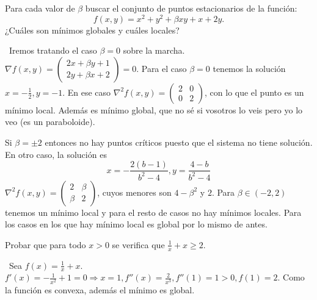 \documentclass[twoside]{article}
\begin{document}
\newpage 

\begin{ejercicio}{5}

Para cada valor de $\beta$ buscar el conjunto de puntos estacionarios de la función: $$f(x,y)=x^2+y^2+\beta xy+x+2y.$$
¿Cuáles son mínimos globales y cuáles locales?
\begin{solucion}\
Iremos tratando el caso $\beta=0$ sobre la marcha. $\nabla f(x,y)=\begin{pmatrix}
2x+\beta y +1\\
2y+\beta x+2
\end{pmatrix}=0$. Para el caso $\beta=0$ tenemos la solución $x=-\frac{1}{2},y=-1$. En ese caso $\nabla^2 f(x,y)=\begin{pmatrix}
2 & 0\\
0 & 2
\end{pmatrix}$, con lo que el punto es un mínimo local.  Además es mínimo global, que no sé si vosotros lo veis pero yo lo veo (es un paraboloide).

Si $\beta=\pm 2$ entonces no hay puntos críticos puesto que el sistema no tiene solución. En otro caso, la solución es 
$$x=-\frac{2(b-1)}{b^2-4}, y=\frac{4-b}{b^2-4}$$
$\nabla^2 f(x,y)=\begin{pmatrix}
2 & \beta\\
\beta & 2
\end{pmatrix}$, cuyos menores son $4-\beta^2$ y $2$. Para $\beta\in (-2,2)$ tenemos un mínimo local y para el resto de casos no hay mínimos locales. Para los casos en los que hay mínimo local es global por lo mismo de antes. 
\end{solucion}
\end{ejercicio}

\newpage 

\begin{ejercicio}{6}
Probar que para todo $x>0$ se verifica que $\frac{1}{x}+x\geq 2$.

\begin{solucion}\
Sea $f(x)=\frac{1}{x}+x$. $f'(x)=-\frac{1}{x^2}+1=0\Rightarrow x=1, f''(x)=\frac{2}{x^3},f''(1)=1>0, f(1)=2$. Como la función es convexa, además el mínimo es global.
\end{solucion}
\end{ejercicio}

\newpage 
\end{document}
